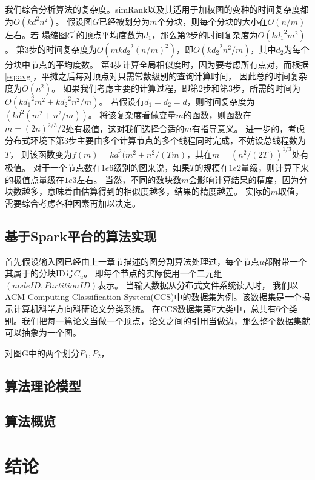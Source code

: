 \documentclass[master]{njuthesis}
\begin{document}
我们综合分析算法的复杂度。simRank以及其适用于加权图的变种的时间复杂度都为$O(kd^2n^2)$。
假设图$G$已经被划分为$m$个分块，则每个分块的大小在$O(n/m)$左右。若
塌缩图$G^\prime$的顶点平均度数为$d_1$，那么第2步的时间复杂度为$O(k{d_1}^2m^2)$。
第3步的时间复杂度为$O(mk{d_2}^2(n/m)^2)$，即$O(k{d_2}^2n^2/m)$，其中$d_2$为每个分块中节点的平均度数。
第4步计算全局相似度时，因为要考虑所有点对，而根据\ref{eq:avg}，平摊之后每对顶点对只需常数级别的查询计算时间，
因此总的时间复杂度为$O(n^2)$。
如果我们考虑主要的计算过程，即第2步和第3步，所需的时间为$O(k{d_1}^2m^2+k{d_2}^2n^2/m)$。
若假设有$d_1=d_2=d$，则时间复杂度为$(kd^2(m^2+n^2/m))$。 
将该复杂度看做变量$m$的函数，则函数在$m=(2n)^{2/3}/2$处有极值，这对我们选择合适的$m$有指导意义。
进一步的，考虑分布式环境下第3步主要由多个计算节点的多个线程同时完成，不妨设总线程数为$T$，
则该函数变为$f(m)=kd^2(m^2+n^2/(Tm)$，其在$m=(n^2/(2T))^{1/3}$处有极值。
对于一个节点数在$1e6$级别的图来说，如果$T$的规模在$1e2$量级，则计算下来的极值点量级在$1e3$左右。
当然，不同的数块数$m$会影响计算结果的精度，因为分块数越多，意味着由估算得到的相似度越多，结果的精度越差。
实际的$m$取值，需要综合考虑各种因素再加以决定。

\section{基于Spark平台的算法实现}
首先假设输入图已经由上一章节描述的图分割算法处理过，每个节点$u$都附带一个其属于的分块ID号$C_u$。
即每个节点的实际使用一个二元组$(nodeID, PartitionID)$表示。
当输入数据从分布式文件系统读入时，
我们以ACM Computing Classification System(CCS)中的数据集为例。该数据集是一个揭示计算机科学方向科研论文分类系统。
在CCS数据集第F大类中，总共有6个类别。我们把每一篇论文当做一个顶点，论文之间的引用当做边，那么整个数据集就可以抽象为一个图。
\begin{definition}
 对图G中的两个划分$P_1, P_2$，
\end{definition}
\section{算法理论模型}
\section{算法概览}



\chapter{结论}\label{chapter_concludes}
\end{document}
